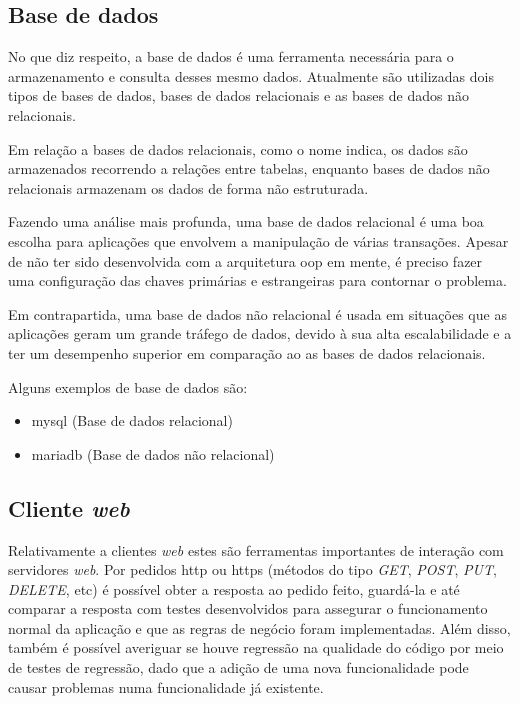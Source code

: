 \subsection{Base de dados}
No que diz respeito, a base de dados é uma ferramenta necessária para o armazenamento e consulta desses mesmo dados. Atualmente são utilizadas dois tipos de bases de dados, bases de dados relacionais e as bases de dados não relacionais.

Em relação a bases de dados relacionais, como o nome indica, os dados são armazenados recorrendo a relações entre tabelas, enquanto bases de dados não relacionais armazenam os dados de forma não estruturada.

Fazendo uma análise mais profunda, uma base de dados relacional é uma boa escolha para aplicações que envolvem a manipulação de várias transações. Apesar de não ter sido desenvolvida com a arquitetura \ac{oop} em mente, é preciso fazer uma configuração das chaves primárias e estrangeiras para contornar o problema. 

Em contrapartida, uma base de dados não relacional é usada em situações que as aplicações geram um grande tráfego de dados, devido à sua alta escalabilidade e a ter um desempenho superior em comparação ao as bases de dados relacionais.

Alguns exemplos de base de dados são:
\begin{itemize}
    \item \ac{mysql} (Base de dados relacional) \cite{mysql}
    \item \ac{mariadb} (Base de dados não relacional) \cite{mariadb}
\end{itemize}

\subsection{Cliente \textit{web}}
Relativamente a clientes \textit{web} estes são ferramentas importantes de interação com servidores \textit{web}. Por pedidos http ou https (métodos do tipo \textit{GET}, \textit{POST}, \textit{PUT}, \textit{DELETE}, etc) é possível obter a resposta ao pedido feito, guardá-la e até comparar a resposta com testes desenvolvidos para assegurar o funcionamento normal da aplicação e que as regras de negócio foram implementadas. Além disso, também é possível averiguar se houve regressão na qualidade do código por meio de testes de regressão, dado que a adição de uma nova funcionalidade pode causar problemas numa funcionalidade já existente.

